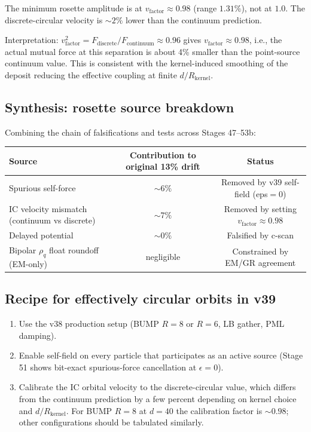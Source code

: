 \documentclass[11pt,a4paper]{article}
\begin{document}
The minimum rosette amplitude is at $v_{\mathrm{factor}} \approx 0.98$
(range $1.31\%$), not at $1.0$.  The discrete-circular velocity is
$\sim 2\%$ lower than the continuum prediction.

Interpretation: $v_{\mathrm{factor}}^2 = F_{\mathrm{discrete}}/F_{\mathrm{continuum}} \approx 0.96$
gives $v_{\mathrm{factor}} \approx 0.98$, i.e., the actual mutual
force at this separation is about 4\% smaller than the point-source
continuum value.  This is consistent with the kernel-induced
smoothing of the deposit reducing the effective coupling at finite
$d/R_{\mathrm{kernel}}$.

\subsection{Synthesis: rosette source breakdown}

Combining the chain of falsifications and tests across Stages 47--53b:

\begin{center}
\begin{tabular}{lcc}
\toprule
Source & Contribution to original 13\% drift & Status \\
\midrule
Spurious self-force                         & $\sim 6\%$ & Removed by v39 self-field (eps$=0$) \\
IC velocity mismatch (continuum vs discrete) & $\sim 7\%$ & Removed by setting $v_{\mathrm{factor}} \approx 0.98$ \\
Delayed potential                            & $\sim 0\%$ & Falsified by c-scan \\
Bipolar $\rho_q$ float roundoff (EM-only)    & negligible & Constrained by EM/GR agreement \\
\bottomrule
\end{tabular}
\end{center}

\subsection{Recipe for effectively circular orbits in v39}

\begin{enumerate}
  \item Use the v38 production setup (BUMP $R=8$ or $R=6$, LB gather,
    PML damping).
  \item Enable self-field on every particle that participates as an
    active source (Stage 51 shows bit-exact spurious-force
    cancellation at $\epsilon = 0$).
  \item Calibrate the IC orbital velocity to the discrete-circular
    value, which differs from the continuum prediction by a few
    percent depending on kernel choice and $d/R_{\mathrm{kernel}}$.
    For BUMP $R=8$ at $d=40$ the calibration factor is $\sim 0.98$;
    other configurations should be tabulated similarly.
\end{enumerate}
\end{document}
